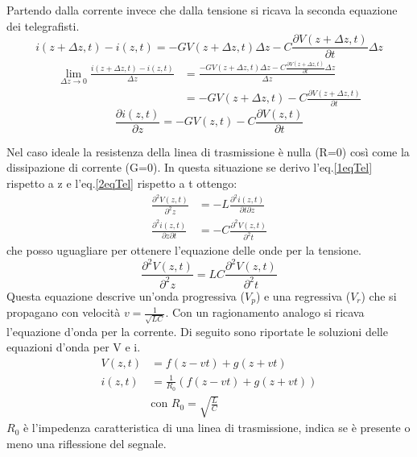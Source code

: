 \documentclass{article}
\begin{document}
Partendo dalla corrente invece che dalla tensione si ricava la seconda equazione dei telegrafisti.
\begin{equation*}
    i(z+\Delta z,t) - i(z,t) = - G V (z+\Delta z,t) \Delta z - C \frac{\partial V (z+\Delta z,t)}{\partial t} \Delta z
\end{equation*}
\begin{align*}
    \lim_{\Delta z \to 0} \frac{i(z+\Delta z,t) - i(z,t)}{\Delta z} &= \frac{- G V (z+\Delta z,t) \Delta z - C \frac{\partial V (z+\Delta z,t)}{\partial t} \Delta z}{\Delta z} \\
                                                                &=- G V (z+\Delta z,t) - C \frac{\partial V (z+\Delta z,t)}{\partial t}
\end{align*}
\begin{equation}\label{2eqTel}
    \frac{\partial i (z,t)}{\partial z} = - G V (z,t) - C \frac{\partial V (z,t)}{\partial t}
\end{equation}

Nel caso ideale la resistenza della linea di trasmissione è nulla (R=0) così come la dissipazione di corrente (G=0).
In questa situazione se derivo l'eq.\ref{1eqTel} rispetto a z e l'eq.\ref{2eqTel} rispetto a t ottengo:
\begin{align*}
    \frac{\partial^2 V (z,t)}{\partial^2 z} &= - L \frac{\partial^2 i (z,t)}{\partial t \partial z}\\
    \frac{\partial^2 i (z,t)}{\partial z \partial t} &= - C \frac{\partial^2 V (z,t)}{\partial^2 t}
\end{align*}
che posso uguagliare per ottenere l'equazione delle onde per la tensione.
\begin{equation}
    \frac{\partial^2 V (z,t)}{\partial^2 z} = L C \frac{\partial^2 V (z,t)}{\partial^2 t}
\end{equation}
Questa equazione descrive un'onda progressiva ($V_p$) e una regressiva ($V_r$) che si propagano con velocità $v = \frac{1}{\sqrt{LC}}$.
Con un ragionamento analogo si ricava l'equazione d'onda per la corrente. 
Di seguito sono riportate le soluzioni delle equazioni d'onda per V e i.
\begin{align*}
    V (z,t) &= f(z-vt) + g(z+vt)\\
    i (z,t) &= \frac{1}{R_0}(f(z-vt) + g(z+vt))\\
    & \textrm{con } R_0=\sqrt{\frac{L}{C}}
\end{align*}
$R_0$ è l'impedenza caratteristica di una linea di trasmissione, indica se è presente o meno una riflessione del segnale.
\end{document}
